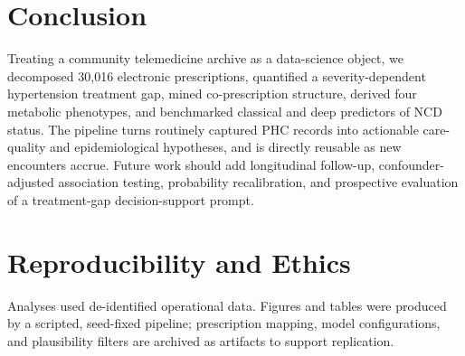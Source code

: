 \documentclass[conference]{IEEEtran}
\begin{document}
\section{Conclusion}
Treating a community telemedicine archive as a data-science object, we decomposed 30{,}016 electronic prescriptions, quantified a severity-dependent hypertension treatment gap, mined co-prescription structure, derived four metabolic phenotypes, and benchmarked classical and deep predictors of NCD status. The pipeline turns routinely captured PHC records into actionable care-quality and epidemiological hypotheses, and is directly reusable as new encounters accrue. Future work should add longitudinal follow-up, confounder-adjusted association testing, probability recalibration, and prospective evaluation of a treatment-gap decision-support prompt.

\section*{Reproducibility and Ethics}
Analyses used de-identified operational data. Figures and tables were produced by a scripted, seed-fixed pipeline; prescription mapping, model configurations, and plausibility filters are archived as artifacts to support replication.


{\footnotesize
\setlength{\IEEEilabelindent}{2pt}
}
\end{document}
